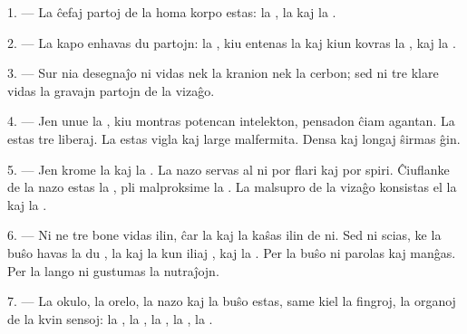 
\VUsaut{4.0mm}
\VUsaut{2.0mm}

\VUsaut{2.4mm}
\VUsaut{3.0mm}

\VUsaut{3.0mm}

1. --- La ĉefaj partoj de la homa korpo estas: la , la
 kaj la .

2. --- La kapo enhavas du partojn: la , kiu entenas la
 kaj kiun kovras la , kaj la .

3. --- Sur nia desegnaĵo ni vidas nek la kranion nek la cerbon; sed ni tre
klare vidas la gravajn partojn de la vizaĝo.

4. --- Jen unue la , kiu montras potencan intelekton, pensadon
ĉiam agantan. La  estas tre liberaj. La  estas
vigla kaj large malfermita. Densa  kaj longaj 
ŝirmas ĝin.

5. --- Jen krome la  kaj la . La nazo servas al
ni por flari kaj por spiri. Ĉiuflanke de la nazo estas la ,
pli malproksime la . La malsupro de la vizaĝo konsistas el la
 kaj la .

6. --- Ni ne tre bone vidas ilin, ĉar la  kaj la
 kaŝas ilin de ni. Sed ni scias, ke la buŝo havas la du
, la  kaj la  kun iliaj , kaj la . Per la buŝo ni
parolas kaj manĝas. Per la lango ni gustumas la nutraĵojn.

7. --- La okulo, la orelo, la nazo kaj la buŝo estas, same kiel la fingroj,
la organoj de la kvin sensoj: la , la , la
, la , la .

